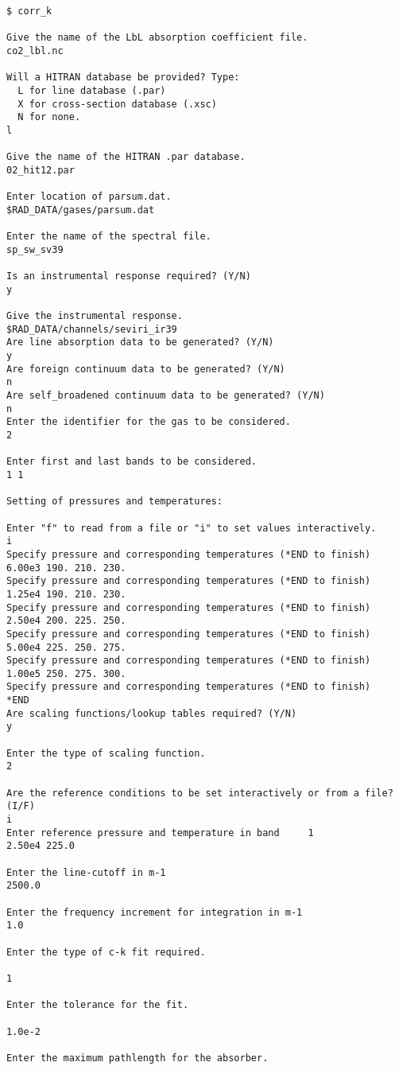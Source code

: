{\small
\begin{verbatim}
$ corr_k

Give the name of the LbL absorption coefficient file.
co2_lbl.nc

Will a HITRAN database be provided? Type:
  L for line database (.par)
  X for cross-section database (.xsc)
  N for none.
l

Give the name of the HITRAN .par database.
02_hit12.par

Enter location of parsum.dat.
$RAD_DATA/gases/parsum.dat

Enter the name of the spectral file.
sp_sw_sv39

Is an instrumental response required? (Y/N)
y

Give the instrumental response.
$RAD_DATA/channels/seviri_ir39
Are line absorption data to be generated? (Y/N)
y
Are foreign continuum data to be generated? (Y/N)
n
Are self_broadened continuum data to be generated? (Y/N)
n
Enter the identifier for the gas to be considered.
2

Enter first and last bands to be considered.
1 1

Setting of pressures and temperatures:

Enter "f" to read from a file or "i" to set values interactively.
i
Specify pressure and corresponding temperatures (*END to finish)
6.00e3 190. 210. 230.
Specify pressure and corresponding temperatures (*END to finish)
1.25e4 190. 210. 230.
Specify pressure and corresponding temperatures (*END to finish)
2.50e4 200. 225. 250.
Specify pressure and corresponding temperatures (*END to finish)
5.00e4 225. 250. 275.
Specify pressure and corresponding temperatures (*END to finish)
1.00e5 250. 275. 300.
Specify pressure and corresponding temperatures (*END to finish)
*END
Are scaling functions/lookup tables required? (Y/N)
y

Enter the type of scaling function.
2

Are the reference conditions to be set interactively or from a file? (I/F)
i
Enter reference pressure and temperature in band     1
2.50e4 225.0

Enter the line-cutoff in m-1
2500.0

Enter the frequency increment for integration in m-1
1.0

Enter the type of c-k fit required.

1

Enter the tolerance for the fit.

1.0e-2

Enter the maximum pathlength for the absorber.


\end{verbatim}}
